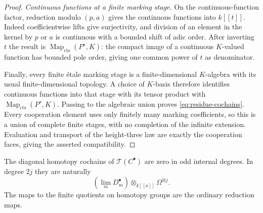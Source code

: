 \begin{proof}
\smallskip\noindent\emph{Continuous functions at a finite marking stage.}
On the continuous-function factor, reduction modulo $(p,a)$ gives
the continuous functions into $k[[t]]$.  Indeed coefficientwise
lifts give surjectivity, and division of an element in the kernel by
$p$ or $a$ is continuous with a bounded shift of adic order.
After inverting $t$ the result is
$\operatorname{Map}_{\mathrm{cts}}(P^s,K)$: the compact image of a
continuous $K$-valued function has bounded pole order, giving one
common power of $t$ as denominator.

Finally, every finite \'{e}tale marking stage is a finite-dimensional
$K$-algebra with its usual finite-dimensional topology.  A choice of
$K$-basis therefore identifies continuous functions into that stage
with its tensor product with
$\operatorname{Map}_{\mathrm{cts}}(P^s,K)$.  Passing to the algebraic
union proves \eqref{eq:residue-cochains}.  Every cooperation element
uses only finitely many marking coefficients, so this is a union of
complete finite stages, with no completion of the infinite extension.
Evaluation and transport of the height-three law are exactly the
cooperation faces, giving the asserted compatibility.
\end{proof}

\begin{lemma}\label{lem:completed-test-terms}
The diagonal homotopy cochains of $\mathcal T(C^\bullet)$ are zero
in odd internal degrees.  In degree $2j$ they are naturally
\begin{equation}\label{eq:completed-homotopy-cochains}
  \left(\lim_m D_m^\bullet\right)
             \otimes_{k[[x]]}\Omega^{\otimes j}.
\end{equation}
The maps to the finite quotients on homotopy groups are the ordinary
reduction maps.
\end{lemma}

